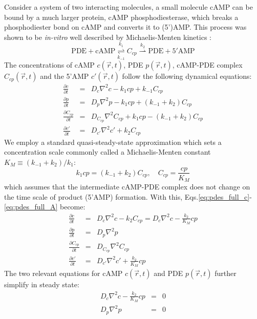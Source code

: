 \documentclass[10pt]{article}
\begin{document}
Consider a system of two interacting molecules, a small molecule cAMP can be bound by a much larger protein, cAMP phosphodiesterase, which breaks a phosphodiester bond on cAMP and converts it to (5')AMP. This process was shown to be \emph{in-vitro} well described by Michaelis-Menten kinetics \cite{KmcAMPPDEandPDI}:
\begin{equation}
	\mathrm{PDE+cAMP}\overset{k_{1}}{\underset{k_{-1}}{\rightleftharpoons}}C_{cp}\overset{k_{2}}{\rightharpoonup}\mathrm{PDE+5'AMP}
	\label{eq:PDEcAMPint}
\end{equation}
The concentrations of cAMP $c(\vec{r},t)$, PDE $p(\vec{r},t)$, cAMP-PDE complex
$C_{cp}(\vec{r},t)$ and the 5'AMP $c'(\vec{r},t)$ follow the following dynamical equations:
\begin{eqnarray}
	\frac{\partial c}{\partial t} & = & D_c \nabla^2 c - k_1 cp + k_{-1} C_{cp} \label{eq:pdes_full_c}\\
	\frac{\partial p}{\partial t} & = & D_p \nabla^2 p - k_1 cp + (k_{-1} + k_2) C_{cp} \label{eq:pdes_full_p}\\
	\frac{\partial C_{cp}}{\partial t} & = & D_{C_{cp}} \nabla^2 C_{cp} + k_1cp - (k_{-1} + k_2)C_{cp} \label{eq:pdes_full_Ccp}\\
	\frac{\partial c'}{\partial t} & = & D_{c'} \nabla^2 c' + k_2 C_{cp} \label{eq:pdes_full_A}
\end{eqnarray}
We employ a standard quasi-steady-state approximation \cite{QSSA} which sets a concentration scale commonly called a Michaelis-Menten constant $K_M \equiv (k_{-1} + k_2)/k_1$:
\begin{equation}
	k_1 cp = (k_{-1} + k_2)C_{cp},\quad C_{cp} = \frac{cp}{K_M}
\end{equation}
which assumes that the intermediate cAMP-PDE complex does not change on the time scale of product (5'AMP) formation. With this, Eqs.\ref{eq:pdes_full_c}-\ref{eq:pdes_full_A} become:
\begin{eqnarray}
	\frac{\partial c}{\partial t} & = & D_c \nabla^2 c - k_2 C_{cp} = D_c \nabla^2 c - \frac{k_2}{K_M} cp \label{eq:pdes_qssa_c}\\
	\frac{\partial p}{\partial t} & = & D_p \nabla^2 p \label{eq:pdes_qssa_p}\\
	\frac{\partial C_{cp}}{\partial t} & = & D_{C_{cp}} \nabla^2 C_{cp} \label{eq:pdes_qssa_Ccp}\\
	\frac{\partial c'}{\partial t} & = & D_{c'} \nabla^2 c' + \frac{k_2}{K_M} cp \label{eq:pdes_qssa_c'}
		\label{eq:pde_qssa}
\end{eqnarray}
The two relevant equations for cAMP $c(\vec{r},t)$ and PDE $p(\vec{r},t)$ further simplify in steady state:
\begin{eqnarray}
	D_c \nabla^2 c - \frac{k_2}{K_M} cp & = & 0 \\
	D_p \nabla^2 p & = & 0
\end{eqnarray}
\end{document}
